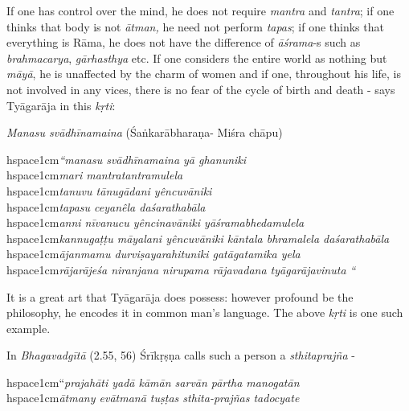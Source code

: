 \vspace{-.3cm}

If one has control over the mind, he does not require \textit{mantra} and \textit{tantra}; if one thinks that body is not \textit{ātman,} he need not perform \textit{tapas}; if one thinks that everything is Rāma, he does not have the difference of \textit{āśrama}-s such as \textit{brahmacarya}, \textit{gārhasthya} etc. If one considers the entire world as nothing but \textit{māyā}, he is unaffected by the charm of women and if one, throughout his life, is not involved in any vices, there is no fear of the cycle of birth and death - says Tyāgarāja in this \textit{kṛti}:

\textit{Manasu svādhīnamaina} (Śaṅkarābharaṇa- Miśra chāpu)

\begin{myquote}
hspace{1cm}\textit{“manasu svādhīnamaina yā ghanuniki}\\hspace{1cm}\textit{mari mantratantramulela}\\hspace{1cm}\textit{tanuvu tānugādani yêncuvāniki}\\hspace{1cm}\textit{tapasu ceyanêla daśarathabāla}\\hspace{1cm}\textit{anni nīvanucu yêncinavāniki yāśramabhedamulela}\\hspace{1cm}\textit{kannugaṭṭu māyalani yêncuvāniki kāntala bhramalela daśarathabāla}\\hspace{1cm}\textit{ājanmamu durviṣayarahituniki gatāgatamika yela}\\hspace{1cm}\textit{rājarājeśa niranjana nirupama rājavadana tyāgarājavinuta “}
\end{myquote}

It is a great art that Tyāgarāja does possess: however profound be the philosophy, he encodes it in common man’s language. The above \textit{kṛti} is one such example. 

In \textit{Bhagavadgītā} (2.55, 56) Śrīkṛṣṇa calls such a person a \textit{sthitaprajña} -

\begin{myquote}
hspace{1cm}“\textit{prajahāti yadā kāmān sarvān pārtha manogatān }\\hspace{1cm}\textit{ātmany evātmanā tuṣṭas sthita-prajñas tadocyate} 
\end{myquote}

